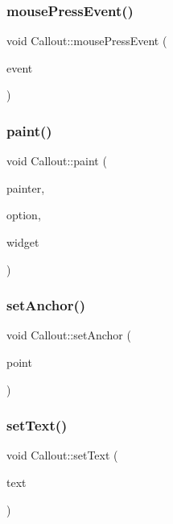 \subsubsection{\texorpdfstring{mouse\+Press\+Event()}{mousePressEvent()}}
{\footnotesize\ttfamily void Callout\+::mouse\+Press\+Event (\begin{DoxyParamCaption}\item[{Q\+Graphics\+Scene\+Mouse\+Event $\ast$}]{event }\end{DoxyParamCaption})\hspace{0.3cm}{\ttfamily [protected]}}

\mbox{\label{class_callout_a291ff0c394d7b11dc7befcf24214b335}} 
\subsubsection{\texorpdfstring{paint()}{paint()}}
{\footnotesize\ttfamily void Callout\+::paint (\begin{DoxyParamCaption}\item[{Q\+Painter $\ast$}]{painter,  }\item[{const Q\+Style\+Option\+Graphics\+Item $\ast$}]{option,  }\item[{Q\+Widget $\ast$}]{widget }\end{DoxyParamCaption})}

\mbox{\label{class_callout_a6784cb674bf4bf81f40fd42d15ac869e}} 
\subsubsection{\texorpdfstring{set\+Anchor()}{setAnchor()}}
{\footnotesize\ttfamily void Callout\+::set\+Anchor (\begin{DoxyParamCaption}\item[{Q\+PointF}]{point }\end{DoxyParamCaption})}

\mbox{\label{class_callout_a5d3f7cfd1413b86ced5df4531cb61c08}} 
\subsubsection{\texorpdfstring{set\+Text()}{setText()}}
{\footnotesize\ttfamily void Callout\+::set\+Text (\begin{DoxyParamCaption}\item[{const Q\+String \&}]{text }\end{DoxyParamCaption})}

